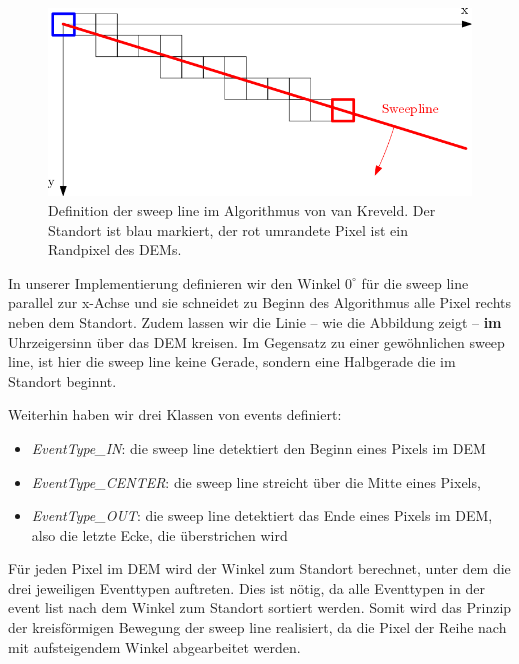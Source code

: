 \begin{figure}[!ht]
 \centering
 \includegraphics[scale=0.45]{bilder/sweep_kreveld}
 \caption{Definition der sweep line im Algorithmus von van Kreveld. Der Standort ist blau markiert, der rot umrandete Pixel ist ein Randpixel des 
 DEMs.}
 \label{sweep_k}
\end{figure}

In unserer Implementierung definieren wir den Winkel $0^\circ$ für die sweep line parallel zur x-Achse und sie schneidet zu Beginn des Algorithmus 
alle Pixel rechts neben dem Standort. Zudem lassen wir die Linie -- wie die Abbildung zeigt -- \textbf{im} Uhrzeigersinn über das DEM kreisen. 
Im Gegensatz zu einer gewöhnlichen sweep line, ist hier die sweep line keine Gerade, sondern eine Halbgerade die im Standort beginnt. 

Weiterhin haben wir drei Klassen von events definiert: 
\begin{itemize}
 \item \textit{EventType\_IN}: die sweep line detektiert den Beginn eines Pixels im DEM 
 \item \textit{EventType\_CENTER}: die sweep line streicht über die Mitte eines Pixels,
 \item \textit{EventType\_OUT}: die sweep line detektiert das Ende eines Pixels im DEM, also die letzte Ecke, die überstrichen wird
\end{itemize}

Für jeden Pixel im DEM wird der Winkel zum Standort berechnet, unter dem die drei jeweiligen Eventtypen auftreten. Dies ist nötig, da alle Eventtypen 
in der event list nach dem Winkel zum Standort sortiert werden. Somit wird das Prinzip der kreisförmigen Bewegung der sweep line realisiert, da die 
Pixel der Reihe nach mit aufsteigendem Winkel abgearbeitet werden. 

